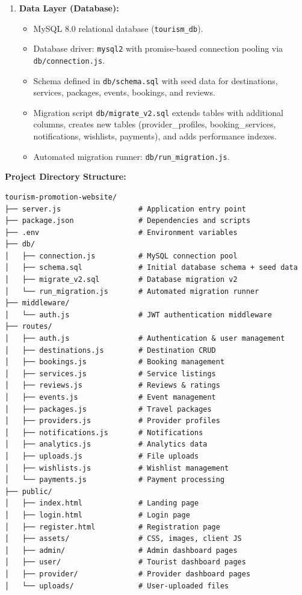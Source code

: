 \begin{enumerate}[leftmargin=2em]
    \item \textbf{Data Layer (Database):}
    \begin{itemize}
        \item MySQL 8.0 relational database (\texttt{tourism\_db}).
        \item Database driver: \texttt{mysql2} with promise-based connection pooling via \texttt{db/connection.js}.
        \item Schema defined in \texttt{db/schema.sql} with seed data for destinations, services, packages, events, bookings, and reviews.
        \item Migration script \texttt{db/migrate\_v2.sql} extends tables with additional columns, creates new tables (provider\_profiles, booking\_services, notifications, wishlists, payments), and adds performance indexes.
        \item Automated migration runner: \texttt{db/run\_migration.js}.
    \end{itemize}
\end{enumerate}

\textbf{Project Directory Structure:}
\begin{verbatim}
tourism-promotion-website/
├── server.js                  # Application entry point
├── package.json               # Dependencies and scripts
├── .env                       # Environment variables
├── db/
│   ├── connection.js          # MySQL connection pool
│   ├── schema.sql             # Initial database schema + seed data
│   ├── migrate_v2.sql         # Database migration v2
│   └── run_migration.js       # Automated migration runner
├── middleware/
│   └── auth.js                # JWT authentication middleware
├── routes/
│   ├── auth.js                # Authentication & user management
│   ├── destinations.js        # Destination CRUD
│   ├── bookings.js            # Booking management
│   ├── services.js            # Service listings
│   ├── reviews.js             # Reviews & ratings
│   ├── events.js              # Event management
│   ├── packages.js            # Travel packages
│   ├── providers.js           # Provider profiles
│   ├── notifications.js       # Notifications
│   ├── analytics.js           # Analytics data
│   ├── uploads.js             # File uploads
│   ├── wishlists.js           # Wishlist management
│   └── payments.js            # Payment processing
├── public/
│   ├── index.html             # Landing page
│   ├── login.html             # Login page
│   ├── register.html          # Registration page
│   ├── assets/                # CSS, images, client JS
│   ├── admin/                 # Admin dashboard pages
│   ├── user/                  # Tourist dashboard pages
│   ├── provider/              # Provider dashboard pages
│   └── uploads/               # User-uploaded files
\end{verbatim}

